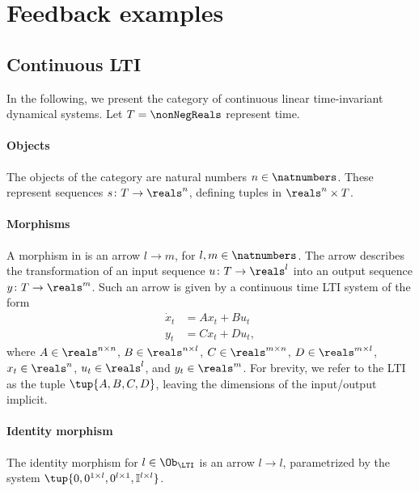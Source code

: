 

\section{Feedback examples}

\subsection{Continuous LTI}
In the following, we present the category of continuous linear time-invariant dynamical systems. Let $T=\nonNegReals$ represent time.

\paragraph{Objects} The objects of the category are natural numbers $n\in \natnumbers $. These represent sequences $s\colon T\to \reals^n$, defining tuples in $\reals^n\times T$.

\paragraph{Morphisms} A morphism in \LTI is an arrow $l\to m$, for $l,m\in \natnumbers $. The arrow describes the transformation of an input sequence $u\colon T\to \reals^l$ into an output sequence $y\colon T\to \reals^m$. Such an arrow is given by a continuous time LTI system of the form
\begin{equation}
  \begin{aligned}
    \dot{x}_t&=A x_t+B u_t\\
    y_t&=C x_t +D u_t,
  \end{aligned}
\end{equation}
where $A\in \reals^{n\times n}$, $B\in \reals^{n\times l}$, $C\in \reals^{m\times n}$, $D\in \reals^{m\times l}$, $x_t\in \reals^n$, $u_t\in \reals^l$, and $y_t\in \reals^m$. For brevity, we refer to the LTI as the tuple $\tup{A,B,C,D}$, leaving the dimensions of the input/output implicit.

\paragraph{Identity morphism}
The identity morphism for $l\in \Ob_\LTI$ is an arrow $l\to l$, parametrized by the system $\tup{0,0^{1\times l},0^{l\times 1},\mathbb{I}^{l\times l}}$.

